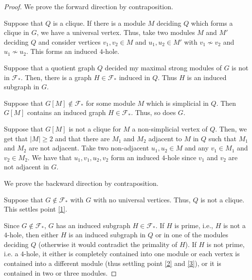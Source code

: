 \documentclass{article}
\theoremstyle{definition}
\begin{document}
    \begin{proof}
        We prove the forward direction by contraposition.
        
        Suppose that $Q$ is a clique. 
        If there is a module $M$ deciding $Q$
        which forms a clique in $G$, we have a universal vertex.
        Thus, take two modules $M$ and $M'$ deciding $Q$ and consider
        vertices $v_1, v_2 \in M$ and  $u_1, u_2 \in M'$ 
        with $v_1 \not \sim v_2$ and $u_1 \not \sim u_2$.
        This forms an induced $4$-hole.

        Suppose that a quotient graph $Q$ decided my maximal strong
        modules of $G$ is not in $\mathcal{F}_{*}$.
        Then, there is a graph $H \in \mathcal{F}_{*}$ induced in $Q$.
        Thus $H$ is an induced subgraph in $G$.

        Suppose that $G[M] \not \in \mathcal{F}_{*}$ for some module $M$ 
        which is simplicial in $Q$. Then $G[M]$ 
        contains an induced graph $H \in \mathcal{F}_{*}$. Thus, so does $G$.

        Suppose that $G\left[M\right]$ is not a clique for $M$ 
        a non-simplicial vertex of $Q$.
        Then, we get that $\left|M\right| \geq 2$ and that
        there are $M_1$ and $M_2$ adjacent to $M$ in $Q$
        such that $M_1$ and $M_2$ are not adjacent.
        Take two non-adjacent $u_1, u_2 \in M$ and
        any $v_1 \in M_1$ and $v_2 \in M_2$.
        We have that $u_1, v_1, u_2, v_2$ form
        an induced $4$-hole since $v_1$ and $v_2$ are
        not adjacent in $G$.
            
        \vspace{5pt}

        We prove the backward direction by contraposition.

        Suppose that $G \not \in \mathcal{F}_{*}$ with $G$ with no universal vertices.
        Thus, $Q$ is not a clique. This settles point \ref{1}.

        Since $G \not \in \mathcal{F}_{*}$, $G$ has an induced subgraph $H \in \mathcal{F}_{*}$.
        If $H$ is prime, i.e., $H$ is not a $4$-hole, 
        then either $H$ is an induced subgraph in $Q$ or in one of the
        modules deciding $Q$ (otherwise it would contradict the primality of $H$).
        If $H$ is not prime, i.e. a  $4$-hole,
        it either is completely
        contained into one module or 
        each vertex is contained into 
        a different module (thus
        settling point \ref{2} and \ref{3}),
        or it is contained in two or three modules.
        

\end{proof}
\end{document}
